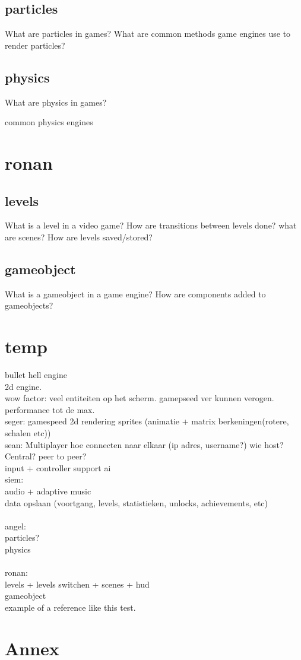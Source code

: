 \documentclass{article} %
\begin{document}
\subsection{particles}
What are particles in games?
What are common methods game engines use to render particles?
\subsection{physics}
What are physics in games?

common physics engines

\newpage

\section{ronan}
\subsection{levels}
What is a level in a video game?
How are transitions between levels done?
what are scenes?
How are levels saved/stored?
\subsection{gameobject}
What is a gameobject in a game engine?
How are components added to gameobjects?

\newpage

\section{temp}
bullet hell engine
\\
2d engine.
\\
wow factor: veel entiteiten op het scherm. gamepseed ver kunnen verogen.
performance tot de max.
\\
seger:
gamespeed
2d rendering
sprites (animatie + matrix berkeningen(rotere, schalen etc))
\\
sean:
Multiplayer
hoe connecten naar elkaar (ip adres, username?)
wie host? Central? peer to peer?
\\
input + controller support
ai
\\
siem:\\
audio + adaptive music\\
data opslaan (voortgang, levels, statistieken, unlocks, achievements, etc)\\
\\
angel:\\
particles?\\
physics\\
\\
ronan:\\
levels + levels switchen + scenes + hud \\
gameobject
\\

example of a reference \cite{Gambetta_2024} like this test.


\newpage

\section{Annex}
\printbibliography %
\end{document}
